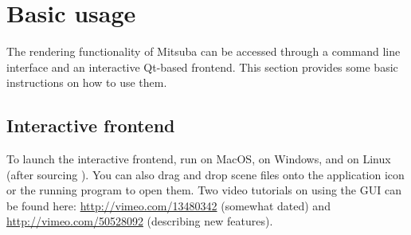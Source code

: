 \section{Basic usage}
\label{sec:basics}
The rendering functionality of Mitsuba can be accessed through
a command line interface and an interactive Qt-based frontend. This section
provides some basic instructions on how to use them.
\subsection{Interactive frontend}
To launch the interactive frontend, run  on MacOS,
 on Windows, and  on Linux (after sourcing ).
You can also drag and drop scene files onto the application icon or the running program to open them.
Two video tutorials on using the GUI can be found here: \url{http://vimeo.com/13480342} (somewhat dated)
and \url{http://vimeo.com/50528092} (describing new features).
